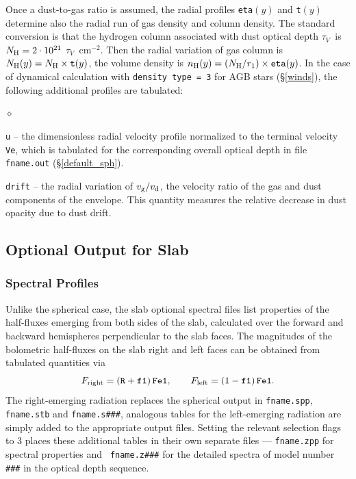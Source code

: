 \documentclass[11pt]{article}
\def\E#1{\hbox{$10^{#1}$}}
\def\tV     {\hbox{$\tau_V$}}
\begin{document}
Once a dust-to-gas ratio is assumed, the radial profiles {\tt eta}$(y)$ and
{\tt t}$(y)$ determine also the radial run of gas density and column density.
The standard conversion is that the hydrogen column associated with dust
optical depth \tV\ is $N_{\rm H} = 2\cdot\E{21}$ \tV\ cm$^{-2}$. Then the
radial variation of gas column is $N_{\rm H}(y) = N_{\rm H}\times{\tt t}(y)$,
the volume density is $n_{\rm H}(y) = (N_{\rm H}/r_1)\times{\tt eta}(y)$. In
the case of dynamical calculation with {\tt density type = 3} for AGB stars
(\S\ref{winds}), the following additional profiles are tabulated:

\begin{list}{$\diamond$}{}
\item
{\tt u} -- the dimensionless radial velocity profile normalized to the terminal
velocity {\tt Ve}, which is tabulated for the corresponding overall optical
depth in file {\tt fname.out} (\S \ref{default_sph}).
\item
{\tt drift} -- the radial variation of $v_{\rm g}/v_{\rm d}$, the velocity
ratio of the gas and dust components of the envelope.  This quantity measures
the relative decrease in dust opacity due to dust drift.

\end{list}

\subsection{Optional Output for Slab}
\label{OptionalOutput_slb}

\subsubsection{Spectral Profiles}
Unlike the spherical case, the slab optional spectral files list properties of
the half-fluxes emerging from both sides of the slab, calculated over the
forward and backward hemispheres perpendicular to the slab faces.  The
magnitudes of the bolometric half-fluxes on the slab right and left faces can
be obtained from tabulated quantities via
 $$ F_{\rm right} = ({\tt R} + {\tt f1})\,{\tt Fe1}, \qquad
    F_{\rm left}  = (1 - {\tt f1})\,{\tt Fe1}. $$
The right-emerging radiation replaces the spherical output in {\tt fname.spp},
{\tt fname.stb} and {\tt fname.s\#\#\#}, analogous tables for the left-emerging
radiation are simply added to the appropriate output files. Setting the
relevant selection flags to 3 places these additional tables in their own
separate files --- {\tt fname.zpp} for spectral properties and {\tt
fname.z\#\#\#} for the detailed spectra of model number {\tt \#\#\#} in the
optical depth sequence.
\end{document}
